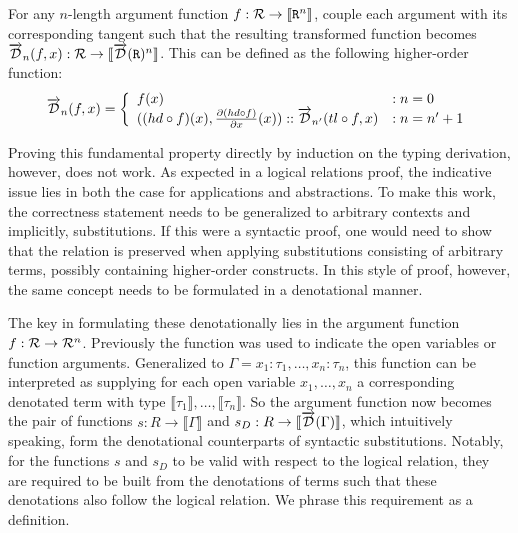   \begin{definition}
    For any $n$-length argument function $f : \mathcal{R} \rightarrow \llbracket \texttt{R}^n \rrbracket$, couple each argument with its corresponding tangent such that the resulting transformed function becomes $\overrightarrow{\mathcal{D}}_n(f, x) : \mathcal{R} \rightarrow \llbracket \overrightarrow{\mathcal{D}}(\texttt{R})^n \rrbracket$. This can be defined as the following higher-order function:
    \begin{equation*}
      \overrightarrow{\mathcal{D}}_n(f, x) =
        \left\{
          \begin{array}{ll}
            f(x) & : n = 0 \\
            ((hd \circ f)(x), \frac{\partial{(hd \circ f)}}{\partial{x}}(x)) :: \overrightarrow{\mathcal{D}}_{n'}(tl \circ f, x) & : n = n' + 1 \\
          \end{array}
        \right.
    \label{eqn:argument_df}
    \end{equation*}
  \end{definition}

  Proving this fundamental property directly by induction on the typing derivation, however, does not work.
  As expected in a logical relations proof, the indicative issue lies in both the case for applications and abstractions.
  To make this work, the correctness statement needs to be generalized to arbitrary contexts and implicitly, substitutions.
  If this were a syntactic proof, one would need to show that the relation is preserved when applying substitutions consisting of arbitrary terms, possibly containing higher-order constructs.
  In this style of proof, however, the same concept needs to be formulated in a denotational manner.

  The key in formulating these denotationally lies in the argument function $f : \mathcal{R} \to \mathcal{R}^n$.
  Previously the function was used to indicate the open variables or function arguments.
  Generalized to $\Gamma = x_1 : \tau_1, \dots, x_n : \tau_n$, this function can be interpreted as supplying for each open variable $x_1, \dots, x_n$ a corresponding denotated term with type $\llbracket \tau_1 \rrbracket, \dots, \llbracket \tau_n \rrbracket$.
  So the argument function now becomes the pair of functions $s : R \rightarrow \llbracket \Gamma \rrbracket$ and $s_D : R \rightarrow \llbracket \overrightarrow{\mathcal{D}}(\Gamma) \rrbracket$, which intuitively speaking, form the denotational counterparts of syntactic substitutions.
  Notably, for the functions $s$ and $s_D$ to be valid with respect to the logical relation, they are required to be built from the denotations of terms such that these denotations also follow the logical relation.
  We phrase this requirement as a definition.

